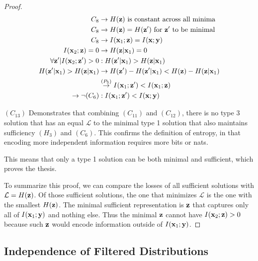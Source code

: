 \begin{theorem}
\begin{proof}
$$
\begin{aligned}
C_8 &\rightarrow  H({\mathbf{z}}) \text{ is constant across all minima}\\
C_8 &\rightarrow  H({\mathbf{z}}) = H({\mathbf{z}}')\text{ for } {\mathbf{z}}' \text{ to be minimal}\\
C_8 &\rightarrow  I({\mathbf{x}}_1; {\mathbf{z}}) = I({\mathbf{x}}; {\mathbf{y}})\\
I({\mathbf{x}}_2; {\mathbf{z}}) = 0 &\rightarrow H({\mathbf{z}}| {\mathbf{x}}_1) = 0 \\
\forall {\mathbf{z}}'|I({\mathbf{x}}_2; {\mathbf{z}}') > 0  &:  H({\mathbf{z}}'| {\mathbf{x}}_1) > H({\mathbf{z}}| {\mathbf{x}}_1) \\
H({\mathbf{z}}'| {\mathbf{x}}_1) > H({\mathbf{z}}| {\mathbf{x}}_1)   &\rightarrow H({\mathbf{z}}') - H({\mathbf{z}}'| {\mathbf{x}}_1) < H({\mathbf{z}}) - H({\mathbf{z}}| {\mathbf{x}}_1)  \\
&\stackrel{\left(P_5\right)}{\rightarrow}  I({\mathbf{x}}_1; {\mathbf{z}}') < I({\mathbf{x}}_1; {\mathbf{z}})  \\
\rightarrow \neg (C_6) &:  I({\mathbf{x}}_1; {\mathbf{z}}') < I({\mathbf{x}}; {\mathbf{y}})
\end{aligned}
$$

$(C_{13})$ Demonstrates that combining $(C_{11})$ and $(C_{12})$, there is no type 3 solution that has an equal $\mathcal{L}$ to the minimal type 1 solution that also maintains sufficiency $(H_3)$ and $(C_6)$. This confirms the definition of entropy, in that encoding more independent information requires more bits or nats.

This means that only a type 1 solution can be both minimal and sufficient, which proves the thesis.

To summarize this proof, we can compare the losses of all sufficient solutions with $\mathcal{L} = H({\mathbf{z}})$. Of those sufficient solutions, the one that minimizes $\mathcal{L}$ is the one with the smallest $H({\mathbf{z}})$. The minimal sufficient representation is ${\mathbf{z}}$ that captures only all of $I({\mathbf{x}}_1; {\mathbf{y}})$ and nothing else. Thus the minimal ${\mathbf{z}}$ cannot have $I({\mathbf{x}}_2; {\mathbf{z}}) > 0$ because such ${\mathbf{z}}$ would encode information outside of $I({\mathbf{x}}_1; {\mathbf{y}})$.

\end{proof}
\label{genloss}
\end{theorem}

\subsection{Independence of Filtered Distributions}
\label{app:filter}

